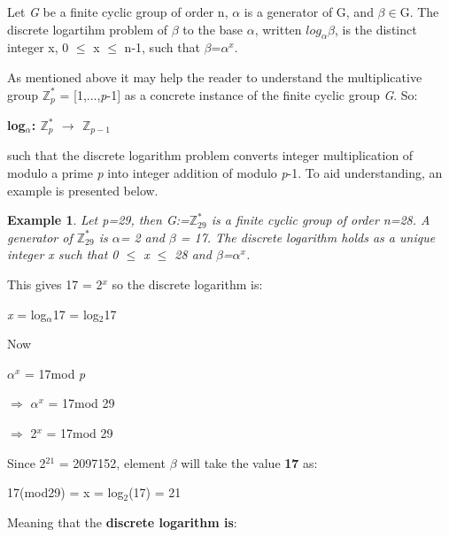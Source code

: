 \documentclass[iwp,first]{luthesis}
\begin{document}
\begin{mydef}
Let \textit{G} be a finite cyclic group of order n, $\alpha$ is a generator of G, and $\beta$$\in$G. The discrete logartihm problem of $\beta$ to the base $\alpha$, written $log_\alpha$$\beta$, is the distinct integer x, 0 $\leq$ x $\leq$ n-1, such that $\beta$=$\alpha$$^x$.
\end{mydef}

As mentioned above it may help the reader to understand the multiplicative group $\mathbb{Z}^{*}_{p}$ = [1,...,\textit{p}-1] as a concrete instance of the finite cyclic group \textit{G}. So:

\begin{center}
\textbf{log$_\alpha$: $\mathbb{Z}^{*}_{p}$ $\longrightarrow$ $\mathbb{Z}_{p-1}$}
\end{center}
such that the discrete logarithm problem converts integer multiplication of modulo a prime \textit{p} into integer addition of modulo \textit{p}-1. To aid understanding, an example is presented below.

\newtheorem{example}{Example}
\begin{example}

Let p=29, then G:=$\mathbb{Z}^{*}_{29}$ is a finite cyclic group of order n=28. A generator of $\mathbb{Z}^{*}_{29}$ is $\alpha$= 2 and $\beta$ = 17. The discrete logarithm holds as a unique integer \textit{x} such that \textit{0 $\leq$ x $\leq$ 28} and $\beta$=$\alpha$$^x$.
\end{example}

This gives 17 = 2$^x$ so the discrete logarithm is:

\begin{center}
\textit{x} = log$_\alpha$17 = log$_2$17
\end{center}

Now

\begin{center}
\textit{$\alpha$$^x$} = 17mod \textit{p}

$\Rightarrow$ \textit{$\alpha$$^x$} = 17mod 29

$\Rightarrow$ 2$^x$ = 17mod 29
\end{center}

Since 2$^{21}$ = 2097152, element $\beta$ will take the value \textbf{17} as:

\begin{center}
17(mod29) = x = log$_2$(17) = 21
\end{center}

Meaning that the \textbf{discrete logarithm is}:
\end{document}
